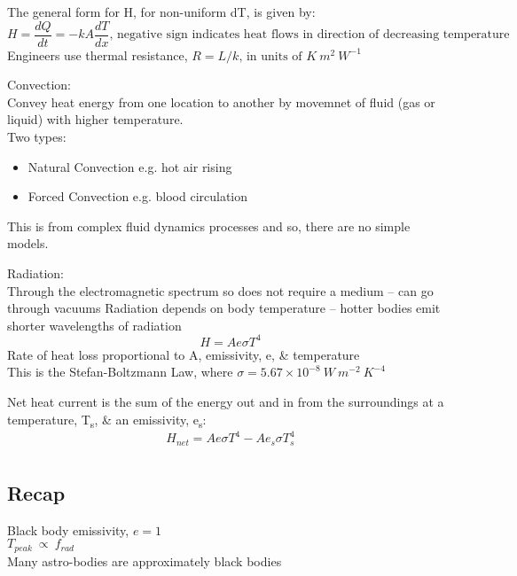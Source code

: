 \documentclass[a4paper, 11pt, fleqn, normalem]{report}
\begin{document}
The general form for H, for non-uniform dT, is given by:
\begin{equation*}
	H = \frac{dQ}{dt} = -kA\frac{dT}{dx}\text{, negative sign indicates heat flows in direction of decreasing temperature}
\end{equation*}
Engineers use thermal resistance, $R = L/k \text{, in units of } K~m^{2}~W^{-1}$

Convection: \\
Convey heat energy from one location to another by movemnet of fluid (gas or liquid) with higher temperature. \\
Two types:
\vspace{-8pt}
\begin{itemize}
	\item Natural Convection e.g. hot air rising
	\item Forced Convection e.g. blood circulation
\end{itemize}
\vspace{-8pt}
This is from complex fluid dynamics processes and so, there are no simple models.

Radiation: \\
Through the electromagnetic spectrum so does not require a medium -- can go through vacuums
Radiation depends on body temperature -- hotter bodies emit shorter wavelengths of radiation
\begin{equation*}
	H = Ae{\sigma}T^{4}
\end{equation*}
Rate of heat loss proportional to A, emissivity, e, \& temperature \\
This is the Stefan-Boltzmann Law, where $\sigma = 5.67\times10^{-8}~W~m^{-2}~K^{-4}$

Net heat current is the sum of the energy out and in from the surroundings at a temperature, T\textsubscript{s}, \& an emissivity, e\textsubscript{s}:
\begin{equation*}
	H_{net} = Ae{\sigma}T^{4} - Ae_{s}{\sigma}T^{4}_{s}
\end{equation*}

\chapter{}
\section*{Recap}
Black body emissivity, $e = 1$ \\
$T_{peak} ~\propto~f_{rad}$ \\
Many astro-bodies are approximately black bodies
\end{document}
